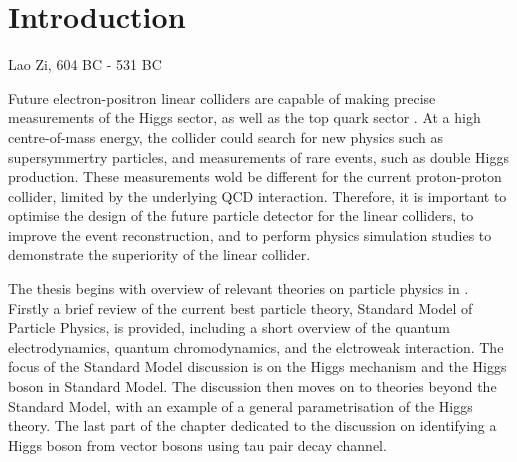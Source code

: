 \chapter{Introduction}
\label{chap:Introduction}



%
{Lao Zi, 604 BC - 531 BC}%



Future electron-positron linear colliders are capable of making precise measurements of the Higgs sector, as well as the top quark sector \cite{Brau:2007zza,Linssen:2012hp}. At a high centre-of-mass energy, the collider could search for new physics such as supersymmertry particles, and  measurements of rare events, such as double Higgs production. These measurements wold be different for the current proton-proton collider, limited by the underlying QCD interaction. Therefore, it is important to optimise the design of the future particle detector for the linear colliders, to improve the event reconstruction, and to perform physics simulation studies to demonstrate the superiority of the linear collider.



The thesis begins with overview of relevant theories on particle physics in .  Firstly a brief review of the   current best particle theory, Standard Model of Particle Physics, is provided, including a short overview of the quantum electrodynamics, quantum chromodynamics, and the elctroweak interaction. The focus of the Standard Model discussion is on the  Higgs mechanism and the Higgs boson in Standard Model. The discussion then moves on to theories beyond the Standard Model, with an example of   a general parametrisation of the Higgs theory. The last part of the chapter dedicated to the discussion on identifying a Higgs boson from vector bosons using tau pair decay channel.


